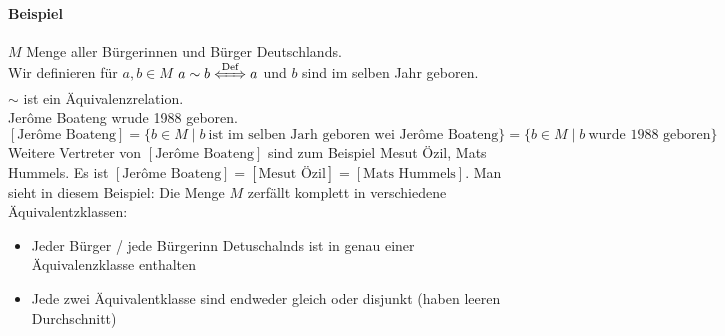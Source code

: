 \documentclass[a4paper]{scrartcl}
\begin{document}
\paragraph{Beispiel}
\label{sec-2-5-6-1}
$M$ Menge aller Bürgerinnen und Bürger Deutschlands. \\
     Wir definieren für $a,b\in M$ $a\sim b \xLeftrightarrow{\text{Def}} a$ und $b$ sind im selben Jahr geboren. \\
     $\sim$ ist ein Äquivalenzrelation. \\
     Jerôme Boateng wrude 1988 geboren. $[\text{Jerôme Boateng}] = \{b\in M\mid b~\text{ist im selben Jarh geboren wei Jerôme Boateng}\} = \{b\in M\mid b~\text{wurde 1988 geboren}\}$
Weitere Vertreter von $[\text{Jerôme Boateng}]$ sind zum Beispiel Mesut Özil, Mats Hummels.
Es ist $[\text{Jerôme Boateng}] = [\text{Mesut Özil}] = [\text{Mats Hummels}]$.
Man sieht in diesem Beispiel: Die Menge $M$ zerfällt komplett in verschiedene Äquivalentzklassen:
\begin{itemize}
\item Jeder Bürger / jede Bürgerinn Detuschalnds ist in genau einer Äquivalenzklasse enthalten
\item Jede zwei Äquivalentklasse sind endweder gleich oder disjunkt (haben leeren Durchschnitt)
\end{itemize}
\end{document}

